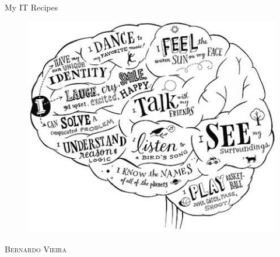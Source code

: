 \begin{titlepage}
\vspace*{\fill}
\begin{center}
{\fontsize{50}{60}\selectfont My IT Recipes}\\[0.5cm]
\begin{figure}[h]
\begin{center}
\includegraphics[scale=0.5]{Figs/brain.jpg}
\end{center}
\end{figure}
\vspace{4em}
\textsc{\Large Bernardo Vieira}\\[1em]
\end{center}
\vspace*{\fill}
\end{titlepage}
